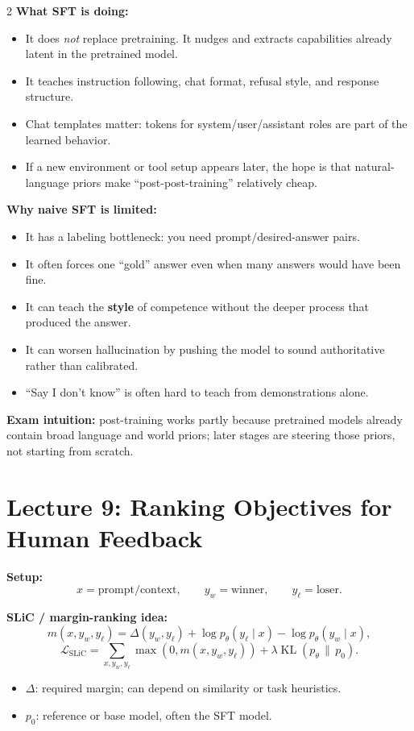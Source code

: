 \documentclass[10pt]{article}
\newcommand{\KL}{\operatorname{KL}}
\begin{document}
\begin{multicols*}{2}
\textbf{What SFT is doing:}
\begin{itemize}
\item It does \emph{not} replace pretraining. It nudges and extracts capabilities already latent in the pretrained model.
\item It teaches instruction following, chat format, refusal style, and response structure.
\item Chat templates matter: tokens for system/user/assistant roles are part of the learned behavior.
\item If a new environment or tool setup appears later, the hope is that natural-language priors make ``post-post-training'' relatively cheap.
\end{itemize}

\textbf{Why naive SFT is limited:}
\begin{itemize}
\item It has a labeling bottleneck: you need prompt/desired-answer pairs.
\item It often forces one ``gold'' answer even when many answers would have been fine.
\item It can teach the \textbf{style} of competence without the deeper process that produced the answer.
\item It can worsen hallucination by pushing the model to sound authoritative rather than calibrated.
\item ``Say I don't know'' is often hard to teach from demonstrations alone.
\end{itemize}

\textbf{Exam intuition:} post-training works partly because pretrained models already contain broad language and world priors; later stages are steering those priors, not starting from scratch.

\section*{Lecture 9: Ranking Objectives for Human Feedback}
\textbf{Setup:}
\[
x=\text{prompt/context},
\qquad
y_w=\text{winner},
\qquad
y_\ell=\text{loser}.
\]

\textbf{SLiC / margin-ranking idea:}
\[
m(x,y_w,y_\ell)
=
\Delta(y_w,y_\ell)
+ \log p_\theta(y_\ell \mid x)
- \log p_\theta(y_w \mid x),
\]
\[
\mathcal{L}_{\mathrm{SLiC}}
=
\sum_{x,y_w,y_\ell} \max\!\left(0,m(x,y_w,y_\ell)\right)
+ \lambda \KL(p_\theta \,\|\, p_0).
\]
\begin{itemize}
\item \(\Delta\): required margin; can depend on similarity or task heuristics.
\item \(p_0\): reference or base model, often the SFT model.
\end{itemize}


\end{multicols*}
\end{document}
